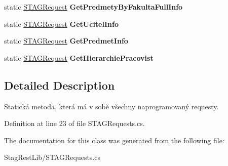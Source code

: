 \begin{DoxyCompactItemize}
\mbox{\label{class_stag_rest_lib_1_1_s_t_a_g_requests_ac05231d1dd289dcccc0398650c277741}} 
static \hyperlink{class_stag_rest_lib_1_1_s_t_a_g_request}{S\+T\+A\+G\+Request} {\bfseries Get\+Predmety\+By\+Fakulta\+Full\+Info}
\item 
\mbox{\label{class_stag_rest_lib_1_1_s_t_a_g_requests_abc080308ef96ff267cd7a97f656b420f}} 
static \hyperlink{class_stag_rest_lib_1_1_s_t_a_g_request}{S\+T\+A\+G\+Request} {\bfseries Get\+Ucitel\+Info}
\item 
\mbox{\label{class_stag_rest_lib_1_1_s_t_a_g_requests_aeda283f4dd5fdb3d180b0fbdbc14d4d8}} 
static \hyperlink{class_stag_rest_lib_1_1_s_t_a_g_request}{S\+T\+A\+G\+Request} {\bfseries Get\+Predmet\+Info}
\item 
\mbox{\label{class_stag_rest_lib_1_1_s_t_a_g_requests_a962ae5db400711e9e7a9aafd38f92ca6}} 
static \hyperlink{class_stag_rest_lib_1_1_s_t_a_g_request}{S\+T\+A\+G\+Request} {\bfseries Get\+Hierarchie\+Pracovist}
\end{DoxyCompactItemize}


\subsection{Detailed Description}
Statická metoda, která má v sobě všechny naprogramovaný requesty. 



Definition at line 23 of file S\+T\+A\+G\+Requests.\+cs.



The documentation for this class was generated from the following file\+:\begin{DoxyCompactItemize}
\item 
Stag\+Rest\+Lib/S\+T\+A\+G\+Requests.\+cs\end{DoxyCompactItemize}
